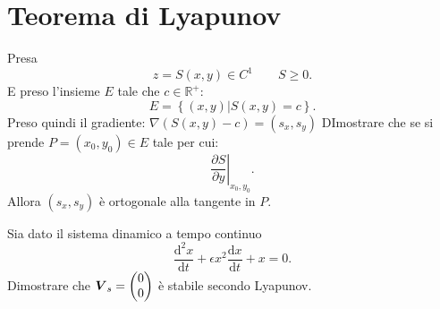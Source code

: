 \section{Teorema di Lyapunov}%
\begin{ex}
    Presa 
    \[
	z = S(x, y) \in C^1 \qquad S\ge 0
    .\] 
    E preso l'insieme $E$ tale che $c \in \mathbb{R}^+$: 
    \[
	E = \left\{(x, y) | S(x, y) = c\right\}
    .\] 
    Preso quindi il gradiente:
    $\nabla (S(x, y) -c) = (s_x, s_y) $ 
    DImostrare che se si prende $P = (x_0, y_0) \in E$ tale per cui:
    \[
        \left. \frac{\partial S}{\partial y} \right|_{x_0, y_0}
    .\] 
    Allora $(s_x, s_y)$ è ortogonale alla tangente in $P$.
\end{ex}
\noindent
\begin{ex}
    Sia dato il sistema dinamico a tempo continuo 
    \[
        \frac{\text{d}^2 x}{\text{d} t} + \epsilon x^2 \frac{\text{d} x}{\text{d} t} + x = 0 
    .\] 
    Dimostrare che $\boldsymbol{V}_s = \begin{pmatrix} 0 \\ 0 \end{pmatrix}$ è stabile secondo Lyapunov.
\end{ex}
